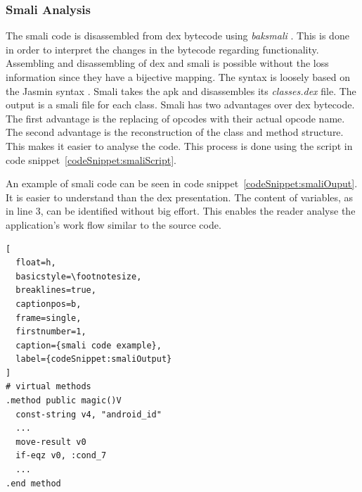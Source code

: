 \subsubsection{Smali Analysis} \label{subsection:tools-baksmali}
The smali code is disassembled from dex bytecode using \textit{baksmali} \cite{smali}.
This is done in order to interpret the changes in the bytecode regarding functionality.
\newline
Assembling and disassembling of dex and smali is possible without the loss information since they have a bijective mapping\cite{smali}.
The syntax is loosely based on the Jasmin syntax \cite{smali}.
Smali takes the \gls{apk} and disassembles its \textit{classes.dex} file.
The output is a smali file for each class.
Smali has two advantages over dex bytecode.
The first advantage is the replacing of opcodes with their actual opcode name.
The second advantage is the reconstruction of the class and method structure.
This makes it easier to analyse the code.
This process is done using the script in code snippet~\ref{codeSnippet:smaliScript}.
\newline

An example of smali code can be seen in code snippet~\ref{codeSnippet:smaliOuput}.
It is easier to understand than the dex presentation.
The content of variables, as in line 3, can be identified without big effort.
This enables the reader analyse the application's work flow similar to the source code.
\newline
\begin{lstlisting}[
  float=h,
  basicstyle=\footnotesize,
  breaklines=true,
  captionpos=b,
  frame=single,
  firstnumber=1,
  caption={smali code example},
  label={codeSnippet:smaliOutput}
]
# virtual methods
.method public magic()V
  const-string v4, "android_id"
  ...
  move-result v0
  if-eqz v0, :cond_7
  ...
.end method
\end{lstlisting}

